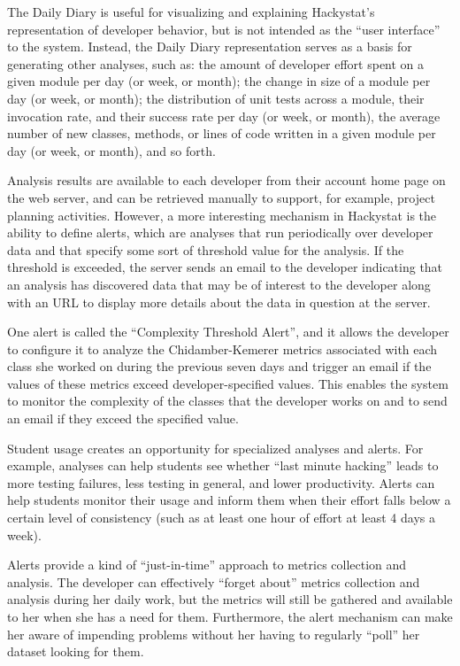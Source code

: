 \documentclass[12pt]{article}
\begin{document}
The Daily Diary is useful for visualizing and explaining Hackystat's
representation of developer behavior, but is not intended as the ``user
interface'' to the system.  Instead, the Daily Diary representation serves
as a basis for generating other analyses, such as: the amount of developer
effort spent on a given module per day (or week, or month); the change in
size of a module per day (or week, or month); the distribution of unit
tests across a module, their invocation rate, and their success rate per
day (or week, or month), the average number of new classes, methods, or
lines of code written in a given module per day (or week, or month), and so
forth.

Analysis results are available to each developer from their account
home page on the web server, and can be retrieved manually to support, for
example, project planning activities.  However, a more interesting
mechanism in Hackystat is the ability to define alerts, which are analyses
that run periodically over developer data and that specify some sort of
threshold value for the analysis.  If the threshold is exceeded, the server
sends an email to the developer indicating that an analysis has discovered
data that may be of interest to the developer along with an URL to display
more details about the data in question at the server.

One alert is called the ``Complexity Threshold Alert'', and it allows the
developer to configure it to analyze the Chidamber-Kemerer metrics
associated with each class she worked on during the previous seven days and 
trigger an email if the values of these metrics exceed developer-specified
values.  This enables the system to monitor the complexity of the classes that 
the developer works on and to send an email if they exceed the specified
value. 

Student usage creates an opportunity for specialized analyses and alerts.
For example, analyses can help students see whether ``last minute hacking'' 
leads to more testing failures, less testing in general, and lower
productivity. Alerts can help students monitor their usage and inform them
when their effort falls below a certain level of consistency (such as at
least one hour of effort at least 4 days a week). 

Alerts provide a kind of ``just-in-time'' approach to metrics collection
and analysis. The developer can effectively ``forget about'' metrics
collection and analysis during her daily work, but the metrics will still
be gathered and available to her when she has a need for them.
Furthermore, the alert mechanism can make her aware of impending problems
without her having to regularly ``poll'' her dataset looking for them.
\end{document}

